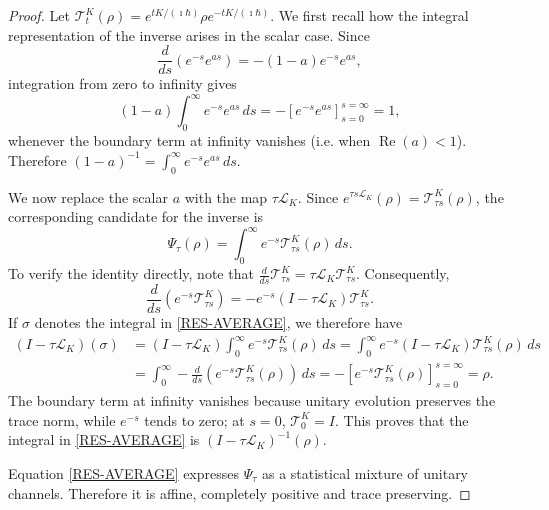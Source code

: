 \documentclass{techbrief}
\begin{document}
\begin{proof}
	Let $\mathcal{T}_t^K(\rho)=e^{tK/(\imath\hbar)}\rho e^{-tK/(\imath\hbar)}$. We first recall how the integral representation of the inverse arises in the scalar case. Since
	\begin{equation}
		\frac{d}{ds}\left(e^{-s}e^{as}\right)=-(1-a)e^{-s}e^{as},
	\end{equation}
	integration from zero to infinity gives
	\begin{equation}
		(1-a)\int_0^{\infty} e^{-s}e^{as}\,ds
		=-\left[e^{-s}e^{as}\right]_{s=0}^{s=\infty}=1,
	\end{equation}
	whenever the boundary term at infinity vanishes (i.e. when $\operatorname{Re}(a)<1$). Therefore $(1-a)^{-1}=\int_0^{\infty} e^{-s}e^{as}\,ds$.

	We now replace the scalar $a$ with the map $\tau\mathcal{L}_K$. Since $e^{\tau s\mathcal{L}_K}(\rho)=\mathcal{T}_{\tau s}^K(\rho)$, the corresponding candidate for the inverse is
	\begin{equation}\label{RES-AVERAGE}
		\Psi_\tau(\rho)=\int_0^\infty e^{-s}\mathcal{T}_{\tau s}^K(\rho)\,ds.
	\end{equation}
	To verify the identity directly, note that $\frac{d}{ds}\mathcal{T}_{\tau s}^K=\tau\mathcal{L}_K\mathcal{T}_{\tau s}^K$. Consequently,
	\begin{equation}
		\frac{d}{ds}\left(e^{-s}\mathcal{T}_{\tau s}^K\right)
		=-e^{-s}(I-\tau\mathcal{L}_K)\mathcal{T}_{\tau s}^K.
	\end{equation}
	If $\sigma$ denotes the integral in \ref{RES-AVERAGE}, we therefore have
	\begin{equation}
	\begin{aligned}
		(I-\tau\mathcal{L}_K)(\sigma)
		&=(I-\tau\mathcal{L}_K)\int_0^\infty e^{-s}\mathcal{T}_{\tau s}^K(\rho)\,ds
		=\int_0^\infty e^{-s}(I-\tau\mathcal{L}_K)\mathcal{T}_{\tau s}^K(\rho)\,ds\\
		&=\int_0^\infty - \frac{d}{ds}\left(e^{-s}\mathcal{T}_{\tau s}^K(\rho)\right)\,ds=-\left[e^{-s}\mathcal{T}_{\tau s}^K(\rho)\right]_{s=0}^{s=\infty}=\rho.
	\end{aligned}
	\end{equation}
	The boundary term at infinity vanishes because unitary evolution preserves the trace norm, while $e^{-s}$ tends to zero; at $s=0$, $\mathcal{T}_0^K=I$. This proves that the integral in \ref{RES-AVERAGE} is $(I-\tau\mathcal{L}_K)^{-1}(\rho)$.

	Equation \ref{RES-AVERAGE} expresses $\Psi_\tau$ as a statistical mixture of unitary channels. Therefore it is affine, completely positive and trace preserving.


\end{proof}
\end{document}
